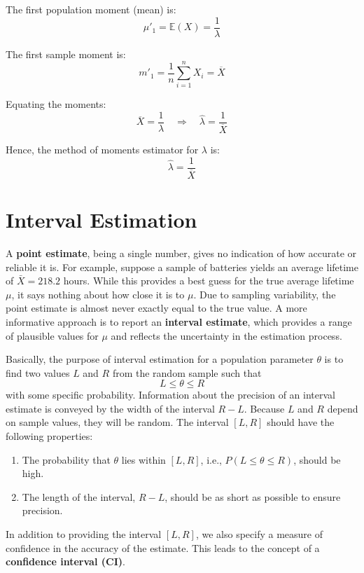 \documentclass[twoside]{book}
\begin{document}
The first population moment (mean) is:
\[
\mu'_1 = \mathbb{E}\left( X\right)  = \frac{1}{\lambda}
\]

The first sample moment is:
\[
m'_1 = \frac{1}{n} \sum_{i=1}^n X_i = \overline{X}
\]

Equating the moments:
\[
\overline{X} = \frac{1}{\lambda}
\quad \Rightarrow \quad
\hat{\lambda} = \frac{1}{\overline{X}}
\]

Hence, the method of moments estimator for \( \lambda \) is:
\[
\hat{\lambda} = \frac{1}{\overline{X}}
\]



\section{Interval Estimation}

A \textbf{point estimate}, being a single number, gives no indication of how accurate or reliable it is. For example, suppose a sample of batteries yields an average lifetime of \( \bar{X} = 218.2 \) hours. While this provides a best guess for the true average lifetime \( \mu \), it says nothing about how close it is to \( \mu \). Due to sampling variability, the point estimate is almost never exactly equal to the true value. A more informative approach is to report an \textbf{interval estimate}, which provides a range of plausible values for \( \mu \) and reflects the uncertainty in the estimation process.


Basically, the purpose of interval estimation for a population parameter $\theta$ is to find two values $L$ and $R$ from the random sample such that $$L \leq \theta \leq R$$ with some specific probability. Information about the precision of an interval estimate is conveyed by the
width of the interval $R-L$. Because $L$ and $R$ depend on sample values, they will be random. The interval $[L,R]$ should have the following properties:
\begin{enumerate}
    \item The probability that $\theta$ lies within $[L, R]$, i.e., $P(L \leq \theta \leq R)$, should be high.
    \item The length of the interval, $R - L$, should be as short as possible to ensure precision.
\end{enumerate}

In addition to providing the interval $[L, R]$, we also specify a measure of confidence in the accuracy of the estimate. This leads to the concept of a \textbf{confidence interval (CI)}.
\end{document}
